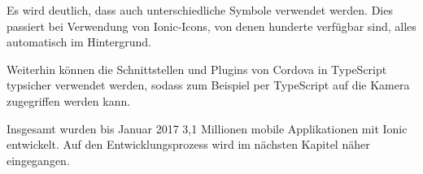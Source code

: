 Es wird deutlich, dass auch unterschiedliche Symbole verwendet werden. Dies passiert bei Verwendung von Ionic-Icons, von denen hunderte verfügbar sind, alles automatisch im Hintergrund.

Weiterhin können die Schnittstellen und Plugins von Cordova in TypeScript typsicher verwendet werden, sodass zum Beispiel per TypeScript auf die Kamera zugegriffen werden kann.

Insgesamt wurden bis Januar 2017 3,1 Millionen mobile Applikationen mit Ionic entwickelt. Auf den Entwicklungsprozess wird im nächsten Kapitel näher eingegangen.




